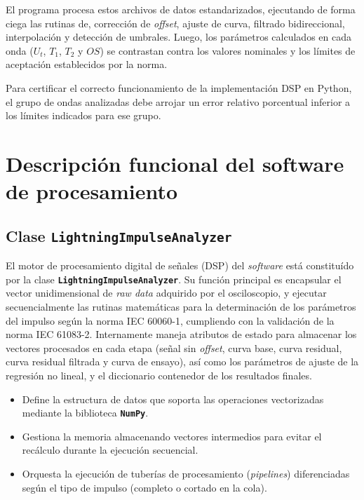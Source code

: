 El programa procesa estos archivos de datos estandarizados, ejecutando de forma ciega las rutinas de, corrección de \textit{offset}, ajuste de curva, filtrado bidireccional, interpolación y detección de umbrales. Luego, los parámetros calculados en cada onda ($U_t$, $T_1$, $T_2$ y $OS$) se contrastan contra los valores nominales y los límites de aceptación establecidos por la norma.

Para certificar el correcto funcionamiento de la implementación DSP en Python, el grupo de ondas analizadas debe arrojar un error relativo porcentual inferior a los límites indicados para ese grupo.




















\section{Descripción funcional del software de procesamiento}

\subsection{Clase \texttt{LightningImpulseAnalyzer}}
El motor de procesamiento digital de señales (DSP) del \textit{software} está constituído por la clase \textbf{\texttt{LightningImpulseAnalyzer}}. Su función principal es encapsular el vector unidimensional de \textit{raw data} adquirido por el osciloscopio, y ejecutar secuencialmente las rutinas matemáticas para la determinación de los parámetros del impulso según la norma IEC 60060-1, cumpliendo con la validación de la norma IEC 61083-2. Internamente maneja atributos de estado para almacenar los vectores procesados en cada etapa (señal sin \textit{offset}, curva base, curva residual, curva residual filtrada y curva de ensayo), así como los parámetros de ajuste de la regresión no lineal, y el diccionario contenedor de los resultados finales.

\begin{itemize}
    \item Define la estructura de datos que soporta las operaciones vectorizadas mediante la biblioteca \textbf{\texttt{NumPy}}.
    \item Gestiona la memoria almacenando vectores intermedios para evitar el recálculo durante la ejecución secuencial.
    \item Orquesta la ejecución de tuberías de procesamiento (\textit{pipelines}) diferenciadas según el tipo de impulso (completo o cortado en la cola).
\end{itemize}

